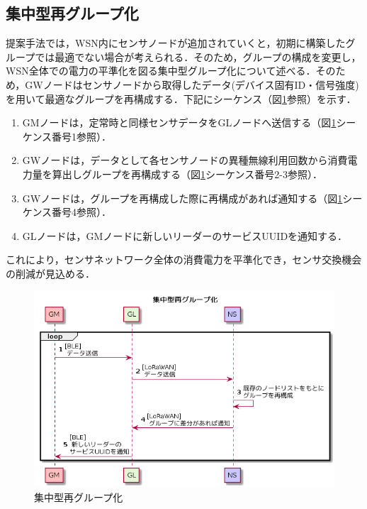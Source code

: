 \subsection{集中型再グループ化}
提案手法では，WSN内にセンサノードが追加されていくと，初期に構築したグループでは最適でない場合が考えられる．そのため，グループの構成を変更し，WSN全体での電力の平準化を図る集中型グループ化について述べる．そのため，GWノードはセンサノードから取得したデータ(デバイス固有ID・信号強度)を用いて最適なグループを再構成する．下記にシーケンス（図\ref{fig:group_reconstruction_concentrately}参照）を示す．

\begin{enumerate}
    \item GMノードは，定常時と同様センサデータをGLノードへ送信する（図\ref{fig:group_reconstruction_concentrately}シーケンス番号1参照）．
    \item GWノードは，データとして各センサノードの異種無線利用回数から消費電力量を算出しグループを再構成する（図\ref{fig:group_reconstruction_concentrately}シーケンス番号2-3参照）．
    \item GWノードは，グループを再構成した際に再構成があれば通知する（図\ref{fig:group_reconstruction_concentrately}シーケンス番号4参照）．
    \item GLノードは，GMノードに新しいリーダーのサービスUUIDを通知する．
\end{enumerate}

これにより，センサネットワーク全体の消費電力を平準化でき，センサ交換機会の削減が見込める．

\begin{figure}[]
    \begin{center}
    \includegraphics[width=14cm]{figures/v2.0/集中型再グループ化.png}
    \caption{集中型再グループ化}
    \label{fig:group_reconstruction_concentrately}
    \end{center}
\end{figure}